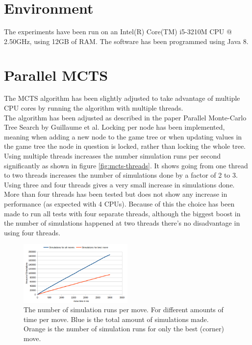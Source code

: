 \documentclass[
11pt, %
english, %
singlespacing, %
headsepline, %
]{MastersDoctoralThesis} %
\begin{document}
\section{Environment}
The experiments have been run on an Intel(R) Core(TM) i5-3210M CPU @ 2.50GHz, using 12GB of RAM. The software has been programmed using Java 8.

\section{Parallel MCTS}
The MCTS algorithm has been slightly adjusted to take advantage of multiple CPU cores by running the algorithm with multiple threads.\\

The algorithm has been adjusted as described in the paper Parallel Monte-Carlo Tree Search\cite{chaslot2008parallel} by Guillaume et al. Locking per node has been implemented, meaning when adding a new node to the game tree or when updating values in the game tree the node in question is locked, rather than locking the whole tree.\\

Using multiple threads increases the number simulation runs per second significantly as shown in figure \ref{fig:mcts-threads}. It shows going from one thread to two threads increases the number of simulations done by a factor of 2 to 3. Using three and four threads gives a very small increase in simulations done. More than four threads has been tested but does not show any increase in performance (as expected with 4 CPUs). Because of this the choice has been made to run all tests with four separate threads, although the biggest boost in the number of simulations happened at two threads there's no disadvantage in using four threads.

\begin{figure}
	\centering
	\includegraphics[width=0.5\textwidth]{images/simulations-time}
	\caption{The number of simulation runs per move. For different amounts of time per move. Blue is the total amount of simulations made. Orange is the number of simulation runs for only the best (corner) move.}
	\label{fig:mcts-simulations-time}
\end{figure}
\end{document}

